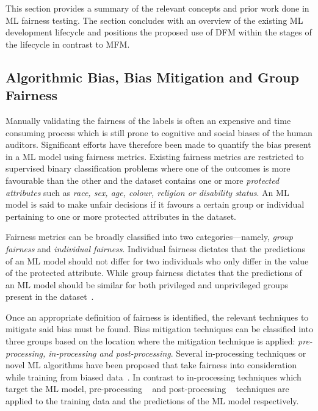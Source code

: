 \documentclass[conference,review,anonymous]{IEEEtran}
\begin{document}
This section provides a summary of the relevant concepts and prior
work done in ML fairness testing. The section concludes with an
overview of the existing ML development lifecycle and positions the
proposed use of DFM within the stages of the lifecycle in contrast to
MFM.

\subsection{Algorithmic Bias, Bias Mitigation and Group Fairness}\label{sec:bias-fairness}

Manually validating the fairness of the labels is often an expensive
and time consuming process which is still prone to cognitive and
social biases of the human auditors. Significant efforts have
therefore been made to quantify the bias present in a ML model using
fairness metrics. Existing fairness metrics are restricted to
supervised binary classification problems where one of the outcomes is
more favourable than the other and the dataset contains one or more
\emph{protected attributes} such as \emph{race, sex, age, colour,
religion or disability status}. An ML model is said to make unfair
decisions if it favours a certain group or individual pertaining to
one or more protected attributes in the dataset.

Fairness metrics can be broadly classified into two
categories---namely, \emph{group fairness} and \emph{individual
fairness}. Individual fairness dictates that the predictions of an ML
model should not differ for two individuals who only differ in the
value of the protected attribute. While group fairness dictates that
the predictions of an ML model should be similar for both privileged
and unprivileged groups present in the
dataset \cite{castelnovo2022clarification,hellman2020measuring,mitchell2021algorithmic,kusner2017counterfactual,grgic2016case,dwork2012fairness,barocas2019fairness,barocas2016big,hardt2016equality,binns2018fairness,verma2018fairness,saxena2019fairness}.

Once an appropriate definition of fairness is identified, the relevant
techniques to mitigate said bias must be found. Bias mitigation
techniques can be classified into three groups based on the location
where the mitigation technique is applied: \emph{pre-processing,
in-processing and post-processing}. Several in-processing techniques
or novel ML algorithms have been proposed that take fairness into
consideration while training from biased
data \cite{zhang2018mitigating,agarwal2018reductions,kearns2018preventing,kamishima2012fairness}.
In contrast to in-processing techniques which target the ML model,
pre-processing
 \cite{feldman2015certifying,zemel2013learning,calmon2017optimized,kamiran2012data}
and post-processing
 \cite{pleiss2017fairness,hardt2016equality,kamiran2012decision}
techniques are applied to the training data and the predictions of the
ML model respectively.
\end{document}
